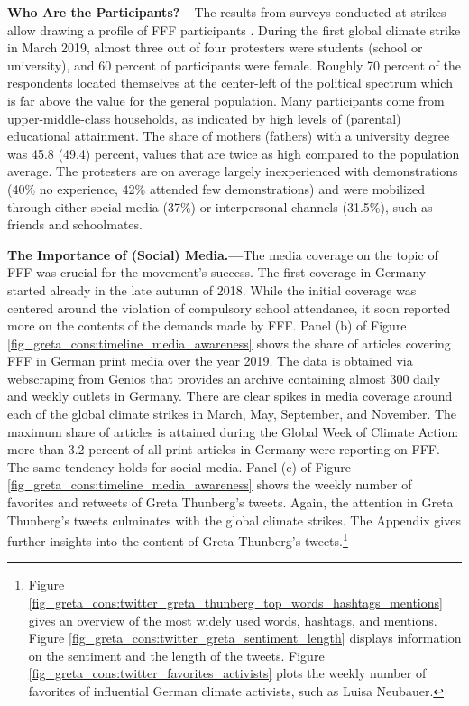 \textbf{Who Are the Participants?---}The results from surveys conducted at strikes allow drawing a profile of FFF participants \citep{sommer2019fridays,demoor2020protest}. During the first global climate strike in March 2019, almost three out of four protesters were students (school or university), and 60 percent of participants were female. Roughly 70 percent of the respondents located themselves at the center-left of the political spectrum which is far above the value for the general population. Many participants come from upper-middle-class households, as indicated by high levels of (parental) educational attainment. The share of mothers (fathers) with a university degree was 45.8 (49.4) percent, values that are twice as high compared to the population average. The protesters are on average largely inexperienced with demonstrations (40\% no experience, 42\% attended few demonstrations) and were mobilized through either social media (37\%) or interpersonal channels (31.5\%), such as friends and schoolmates.




\textbf{The Importance of (Social) Media.---}The media coverage on the topic of FFF was crucial for the movement's success. The first coverage in Germany started already in the late autumn of 2018.
While the initial coverage was centered around the violation of compulsory school attendance, it soon reported more on the contents of the demands made by FFF. Panel (b) of Figure \ref{fig_greta_cons:timeline_media_awareness} shows the share of articles covering FFF in German print media over the year 2019. The data is obtained via webscraping from Genios that provides an archive containing almost 300 daily and weekly outlets in Germany. There are clear spikes in media coverage around each of the global climate strikes in March, May, September, and November. The maximum share of articles is attained during the Global Week of Climate Action: more than 3.2 percent of all print articles in Germany were reporting on FFF. The same tendency holds for social media. Panel (c) of Figure \ref{fig_greta_cons:timeline_media_awareness} shows the weekly number of favorites and retweets of Greta Thunberg's tweets. Again, the attention in Greta Thunberg's tweets culminates with the global climate strikes. The Appendix gives further insights into the content of Greta Thunberg's tweets.\footnote{Figure \ref{fig_greta_cons:twitter_greta_thunberg_top_words_hashtags_mentions} gives an overview of the most widely used words, hashtags, and mentions. Figure \ref{fig_greta_cons:twitter_greta_sentiment_length} displays information on the sentiment and the length of the tweets. Figure \ref{fig_greta_cons:twitter_favorites_activists} plots the weekly number of favorites of influential German climate activists, such as Luisa Neubauer.}



